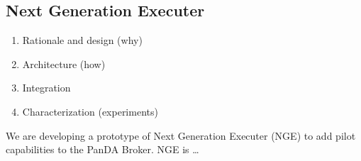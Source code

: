 \subsection{Next Generation Executer}
\label{ssec:nge}

\begin{enumerate}
    \item Rationale and design (why)
    \item Architecture (how)
    \item Integration
    \item Characterization (experiments)
\end{enumerate}

We are developing a prototype of Next Generation Executer (NGE) to add pilot
capabilities to the PanDA Broker. NGE is \ldots
